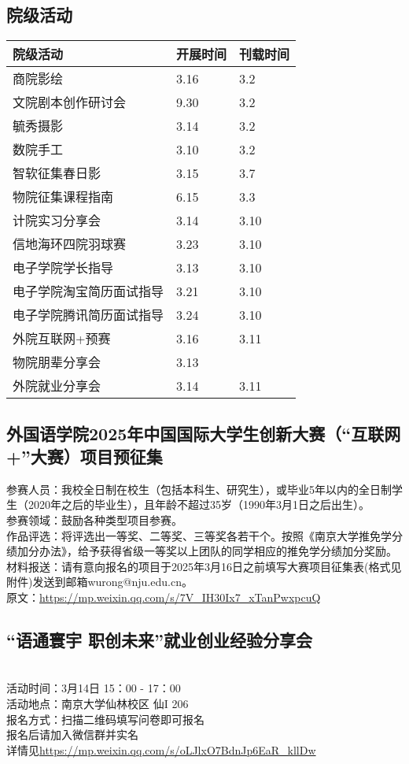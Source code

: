 \documentclass[letterpaper, 12pt]{article}
\begin{document}
\begin{multicols}{2}
\section{院级活动}
\begin{tabular}{|>{\centering\arraybackslash}m{}|m{}|m{}|}
    \hline
    院级活动 & 开展时间 & 刊载时间\\
    \hline\hline
    商院影绘 & 3.16 & 3.2\\
    文院剧本创作研讨会 & 9.30 & 3.2\\
    毓秀摄影 & 3.14 & 3.2\\
    数院手工 & 3.10 & 3.2\\
    智软征集春日影 & 3.15 & 3.7\\
    物院征集课程指南 & 6.15 & 3.3\\
    计院实习分享会 & 3.14 & 3.10\\
    信地海环四院羽球赛 & 3.23 & 3.10\\
    电子学院学长指导 & 3.13 & 3.10\\
    电子学院淘宝简历面试指导 & 3.21 & 3.10\\
    电子学院腾讯简历面试指导 & 3.24 & 3.10\\
    外院互联网+预赛 & 3.16 & 3.11\\
    物院朋辈分享会 & 3.13 &  \\
    外院就业分享会 & 3.14 & 3.11\\
    \hline
\end{tabular}
\subsection{外国语学院2025年中国国际大学生创新大赛（“互联网+”大赛）项目预征集}
参赛人员：我校全日制在校生（包括本科生、研究生），或毕业5年以内的全日制学生（2020年之后的毕业生），且年龄不超过35岁（1990年3月1日之后出生）。\\
参赛领域：鼓励各种类型项目参赛。\\
作品评选：将评选出一等奖、二等奖、三等奖各若干个。按照《南京大学推免学分绩加分办法》，给予获得省级一等奖以上团队的同学相应的推免学分绩加分奖励。\\
材料报送：请有意向报名的项目于2025年3月16日之前填写大赛项目征集表(格式见附件)发送到邮箱wurong@nju.edu.cn。\\
原文：\url{https://mp.weixin.qq.com/s/7V_IH30Ix7_xTanPwxpcuQ}

\subsection{“语通寰宇 职创未来”就业创业经验分享会}\\
活动时间：3月14日 15：00 - 17：00\\
活动地点：南京大学仙林校区 仙I 206\\
报名方式：扫描二维码填写问卷即可报名\\
报名后请加入微信群并实名\\
详情见\url{https://mp.weixin.qq.com/s/oLJlxO7BdnJp6EaR_kllDw}\\

\end{multicols}
\end{document}
